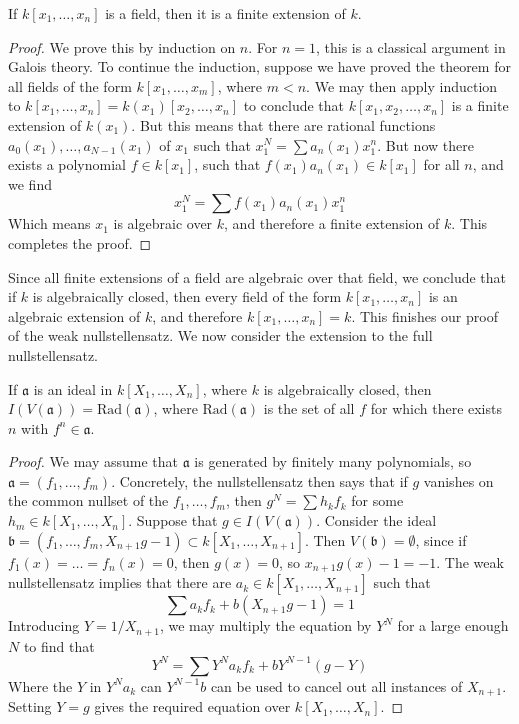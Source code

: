 \begin{lemma}
    If $k[x_1, \dots, x_n]$ is a field, then it is a finite extension of $k$.
\end{lemma}
\begin{proof}
    We prove this by induction on $n$. For $n = 1$, this is a classical argument in Galois theory. To continue the induction, suppose we have proved the theorem for all fields of the form $k[x_1, \dots, x_m]$, where $m < n$. We may then apply induction to $k[x_1, \dots, x_n] = k(x_1)[x_2, \dots, x_n]$ to conclude that $k[x_1, x_2, \dots, x_n]$ is a finite extension of $k(x_1)$. But this means that there are rational functions $a_0(x_1), \dots, a_{N-1}(x_1)$ of $x_1$ such that $x_1^N = \sum a_n(x_1) x_1^n$. But now there exists a polynomial $f \in k[x_1]$, such that $f(x_1) a_n(x_1) \in k[x_1]$ for all $n$, and we find
    \[ x_1^N = \sum f(x_1) a_n(x_1) x_1^n \]
    Which means $x_1$ is algebraic over $k$, and therefore a finite extension of $k$. This completes the proof.
\end{proof}

Since all finite extensions of a field are algebraic over that field, we conclude that if $k$ is algebraically closed, then every field of the form $k[x_1, \dots, x_n]$ is an algebraic extension of $k$, and therefore $k[x_1, \dots, x_n] = k$. This finishes our proof of the weak nullstellensatz. We now consider the extension to the full nullstellensatz.

\begin{theorem}
    If $\mathfrak{a}$ is an ideal in $k[X_1, \dots, X_n]$, where $k$ is algebraically closed, then $I(V(\mathfrak{a})) = \text{Rad}(\mathfrak{a})$, where $\text{Rad}(\mathfrak{a})$ is the set of all $f$ for which there exists $n$ with $f^n \in \mathfrak{a}$.
\end{theorem}
\begin{proof}
    We may assume that $\mathfrak{a}$ is generated by finitely many polynomials, so $\mathfrak{a} = (f_1, \dots, f_m)$.  Concretely, the nullstellensatz then says that if $g$ vanishes on the common nullset of the $f_1, \dots, f_m$, then $g^N = \sum h_kf_k$ for some $h_m \in k[X_1, \dots, X_n]$. Suppose that $g \in I(V(\mathfrak{a}))$. Consider the ideal $\mathfrak{b} = (f_1, \dots, f_m, X_{n+1}g - 1) \subset k[X_1, \dots, X_{n+1}]$. Then $V(\mathfrak{b}) = \emptyset$, since if $f_1(x) = \dots = f_n(x) = 0$, then $g(x) = 0$, so $x_{n+1}g(x) - 1 = -1$. The weak nullstellensatz implies that there are $a_k \in k[X_1, \dots, X_{n+1}]$ such that
    \[ \sum a_k f_k + b (X_{n+1}g - 1) = 1 \]
    Introducing $Y = 1/X_{n+1}$, we may multiply the equation by $Y^N$ for a large enough $N$ to find that
    \[ Y^N = \sum Y^N a_k f_k + b Y^{N-1}(g - Y) \]
    Where the $Y$ in $Y^N a_k$  can $Y^{N-1}b$ can be used to cancel out all instances of $X_{n+1}$. Setting $Y = g$ gives the required equation over $k[X_1, \dots, X_n]$.
\end{proof}

